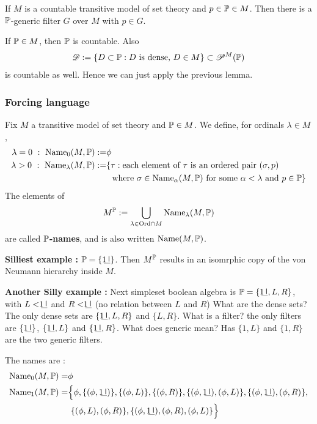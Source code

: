 \documentclass[12pt,a4paper]{article}
\newenvironment{proof}
{\begin{changemargin}{0.5cm}{0.5cm} 
	}%
	{\end{changemargin}
}
\newenvironment{p}
{\begin{proof} 
	}%
	{\end{proof}
}
\begin{document}
\corr If $M$ is a countable transitive model of set theory and $p\in \mathbb{P} \in M$. Then there is a $\mathbb{P}$-generic filter $G$ over $M$ with $p\in G$.
\begin{p}
\pf If $\mathbb{P} \in M$, then $\mathbb{P}$ is countable. Also
\begin{align*}
\mathscr{D} := \{D\subset \mathbb{P} : D \text{ is dense, } D\in M \} \subset \mathscr{P}^M(\mathbb{P})
\end{align*}
is countable as well. Hence we can just apply the previous lemma.

\eop
\end{p}
\s

\subsubsection*{Forcing language}

Fix $M$ a transitive model of set theory and $\mathbb{P} \in M$. We define, for ordinals $\lambda \in M$,
\begin{align*}
\lambda = 0 \,\, : \,\, \text{Name}_0 (M, \mathbb{P}) := & \phi \\
\lambda >0 \,\, : \,\, \text{Name}_{\lambda}(M, \mathbb{P}) := & \{\tau : \text{each element of }\tau \text{ is an ordered pair } (\sigma, p) \\
& \,\, \text{ where } \sigma\in \text{Name}_{\alpha}(M, \mathbb{P}) \text{ for some } \alpha < \lambda \text{ and } p\in \mathbb{P} \}
\end{align*}
The elements of
\begin{align*}
M^{\mathbb{P}} := \bigcup_{\lambda \in \text{Ord} \cap M} \text{Name}_{\lambda}(M, \mathbb{P})
\end{align*}
are called \textbf{$\mathbb{P}$-names}, and is also written $\text{Name}(M, \mathbb{P})$.
\s

\textbf{Silliest example :} $\poset = \{\charac\}$. Then $M^{\mathbb{P}}$ results in an isomrphic copy of the von Neumann hierarchy inside $M$.
\s

\textbf{Another Silly example :} Next simpleset boolean algebra is $\poset = \{\charac, L, R \}$, with $L< \charac$ and $R< \charac$ (no relation between $L$ and $R$) What are the dense sets? The only dense sets are $\{\charac, L, R\}$ and $\{L, R\}$. What is a filter? the only filters are $\{\charac\}$, $\{\charac, L \}$ and $\{\charac, R\}$. What does generic mean? Has $\{1, L \}$ and $\{1, R\}$ are the two generic filters.

\quad The names are :
\begin{align*}
\text{Name}_0 (M, \poset) =& \phi\\ 
\text{Name}_1 (M, \poset) =& \Big\{ \phi,  \{(\phi, \charac) \}, \{(\phi, L) \}, \{(\phi, R) \}, \{(\phi, \charac), (\phi, L)\}, \{(\phi, \charac), (\phi, R)\},\\
& \,\, \{(\phi, L), (\phi, R)\}, \{(\phi, \charac), (\phi, R), (\phi, L)\} \Big\}
\end{align*}
\s
\end{document}
